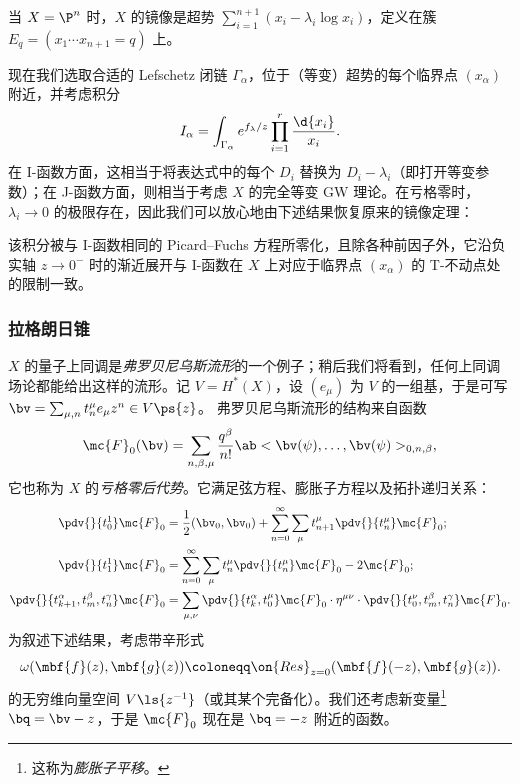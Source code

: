 \begin{exm}
    当 \(X = \P^n\) 时，\(X\) 的镜像是超势 \(\sum_{i=1}^{n+1} (x_i - \lambda_i \log x_i)\)，定义在簇 \(E_q = (x_1 \cdots x_{n+1} = q)\) 上。
\end{exm}

现在我们选取合适的 Lefschetz 闭链 \(\Gamma_{\alpha}\)，位于（等变）超势的每个临界点 \((x_{\alpha})\) 附近，并考虑积分
\[ I_{\alpha} = \int_{\Gamma_{\alpha}} e^{f_{\lambda}/z} \prod_{i=1}^r \frac{\d{x_i}}{x_i}. \]
在 I-函数方面，这相当于将表达式中的每个 \(D_i\) 替换为 \(D_i - \lambda_i\)（即打开等变参数）；在 J-函数方面，则相当于考虑 \(X\) 的完全等变 GW 理论。在亏格零时，\(\lambda_i \to 0\) 的极限存在，因此我们可以放心地由下述结果恢复原来的镜像定理：

\begin{thm}
    该积分被与 I-函数相同的 Picard–Fuchs 方程所零化，且除各种前因子外，它沿负实轴 \(z \to 0^-\) 时的渐近展开与 I-函数在 \(X\) 上对应于临界点 \(( x_{\alpha} )\) 的 T-不动点处的限制一致。
\end{thm}


\subsubsection{拉格朗日锥}%
\label{ssub:The Lagrangian cone}

\(X\) 的量子上同调是\textit{弗罗贝尼乌斯流形}的一个例子；稍后我们将看到，任何上同调场论都能给出这样的流形。记 \(V = H^*(X)\)，设 \((e_{\mu})\) 为 \(V\) 的一组基，于是可写 $\bv = \sum_{\mu,n} t^{\mu}_n e_{\mu} z^n \in V\ps{z}$。
弗罗贝尼乌斯流形的结构来自函数
\[
    \mc{F}_0(\bv) = \sum_{n, \beta, \mu} \frac{q^{\beta}}{n!} \ab<\bv(\psi), \ldots, \bv(\psi)>_{0,n,\beta},
\]
它也称为 \(X\) 的\textit{亏格零后代势}。它满足弦方程、膨胀子方程以及拓扑递归关系：
\begin{align*}
    \pdv{}{t_0^1} \mc{F}_0 &= \frac{1}{2} (\bv_0, \bv_0) + \sum_{n=0}^{\infty} \sum_{\mu} t_{n+1}^{\mu} \pdv{}{t_n^{\mu}} \mc{F}_0; \\
    \pdv{}{t_1^1} \mc{F}_0 &= \sum_{n=0}^{\infty} \sum_{\mu} t_n^{\mu} \pdv{}{t_n^{\mu}}\mc{F}_0 - 2 \mc{F}_0; \\
    \pdv{}{t_{k+1}^{\alpha},t_m^{\beta},t_n^{\gamma}} \mc{F}_0 &= \sum_{\mu,\nu} \pdv{}{t_k^{\alpha},t_0^{\mu}} \mc{F}_0 \cdot \eta^{\mu\nu} \cdot \pdv{}{t_0^{\nu},t_{m}^{\beta},t_n^{\gamma}} \mc{F}_0.
\end{align*}
为叙述下述结果，考虑带辛形式
\[ \omega(\mbf{f}(z), \mbf{g}(z)) \coloneqq \on{Res}_{z=0}(\mbf{f}(-z), \mbf{g}(z)). \]
的无穷维向量空间 $V\ls{z^{-1}}$（或其某个完备化）。我们还考虑新变量\footnote{这称为\textit{膨胀子平移}。} $\bq = \bv - z$，于是 $\mc{F}_0$ 现在是 $\bq = -z$ 附近的函数。

